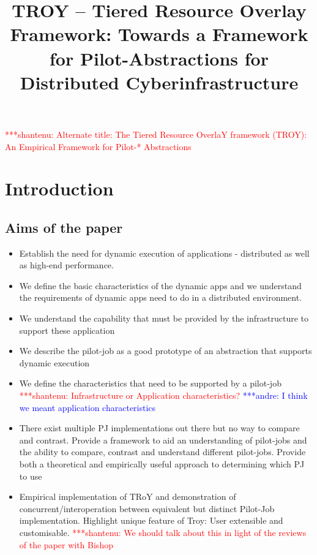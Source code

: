 \documentclass[]{article}
\title{TROY -- Tiered Resource Overlay Framework: Towards a Framework
  for Pilot-Abstractions for Distributed Cyberinfrastructure}
\author{  }
\newcommand{\jhanote}[1]{ {\textcolor{red} { ***shantenu: #1 }}}
\newcommand{\alnote}[1]{ {\textcolor{blue} { ***andre: #1 }}}
\newcommand{\alnote}[1]{}
\begin{document}
\ifpdf
{}
\else
{}
\fi

\maketitle

\jhanote{Alternate title: The Tiered Resource OverlaY framework
  (TROY): An Empirical Framework for Pilot-* Abstractions}


\begin{abstract}

\end{abstract}

\section{Introduction}
\subsection{Aims of the paper}
\begin{itemize}

\item Establish the need for dynamic execution of applications -
  distributed as well as high-end performance.

\item We define the basic characteristics of the dynamic apps and we
  understand the requirements of dynamic apps need to do in a
  distributed environment.

\item We understand the capability that must be provided by the
  infrastructure to support these application

\item We describe the pilot-job as a good prototype of an abstraction
  that supports dynamic execution

\item We define the characteristics that need to be supported by a
  pilot-job \jhanote{Infrastructure or Application characteristics?}
  \alnote{I think we meant application characteristics}

\item There exist multiple PJ implementations out there but no way to
  compare and contrast. Provide a framework to aid an understanding of
  pilot-jobs and the ability to compare, contrast and understand
  different pilot-jobs.  Provide both a theoretical and empirically
  useful approach to determining which PJ to use


\item Empirical implementation of TRoY and demonstration of
  concurrent/interoperation between equivalent but distinct Pilot-Job
  implementation. Highlight unique feature of Troy: User extensible
  and customisable. \jhanote{We should talk about this in light of the
    reviews of the paper with Bishop}
\end{itemize}
\end{document}

